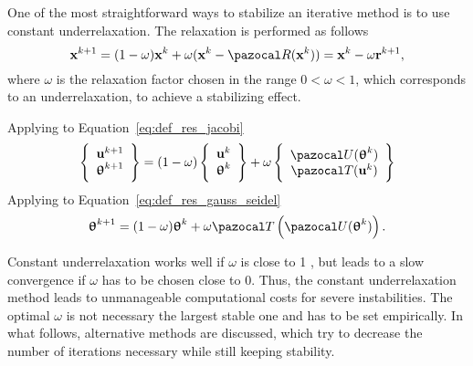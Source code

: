One of the most straightforward ways to stabilize an iterative method is to use constant underrelaxation. \cite{gatzhammer_efficient_2014}
The relaxation is performed as follows
\begin{equation} \label{eq:constant_relaxation}
\mathbf x^{k+1}=(1-\omega) \mathbf x^{k}+\omega(\mathbf x^k - \pazocal R(\mathbf x^k))=\mathbf x^{k} -\omega \mathbf{r}^{k+1},
\end{equation}
where \(\omega\) is the relaxation factor chosen in the range \(0<\omega<1\), which corresponds to an underrelaxation, to achieve a stabilizing effect.

Applying to Equation~\eqref{eq:def_res_jacobi}
\begin{equation}
  \left\{\begin{array}{c}
    \mathbf u^{k+1}\\
    \bm \uptheta^{k+1}
  \end{array}\right\} =
  (1-\omega)
  \left\{\begin{array}{c}
    \mathbf u^{k}\\
    \bm \uptheta^{k}
  \end{array}\right\}
  + \omega
  \left\{\begin{array}{c}
    \pazocal U(\bm\uptheta^k)\\
    \pazocal T(\mathbf u^k)
  \end{array}\right\}
\end{equation}
Applying to Equation~\eqref{eq:def_res_gauss_seidel}
\begin{equation}
  \bm\uptheta^{k+1} = (1-\omega)\bm\uptheta^k + \omega \pazocal T\left(\pazocal U(\bm \uptheta^k)\right).
\end{equation}


Constant underrelaxation works well if \(\omega\) is close to 1 , but leads to a slow convergence if \(\omega\) has to be chosen close to 0.
Thus, the constant underrelaxation method leads to unmanageable computational costs for severe instabilities.
The optimal \(\omega\) is not necessary the largest stable one \citet{gatzhammer_efficient_2014} and has to be set empirically.
In what follows, alternative methods are discussed, which try to decrease the number of iterations necessary while still keeping stability.

